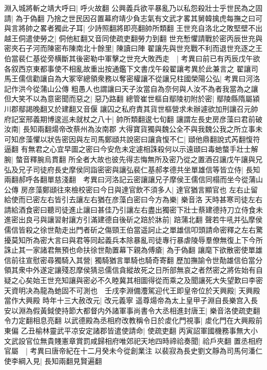 淵入城將斬之靖大呼曰|{
	呼火故翻}
公興義兵欲平暴亂乃以私怨殺壯士乎世民為之固請|{
	為于偽翻}
乃捨之世民因召置幕府靖少負志氣有文武才畧其舅韓擒虎每撫之曰可與言將帥之畧者獨此子耳|{
	少詩照翻將即亮翻帥所類翻}
王世充自洛北之敗堅壁不出越王侗遣使勞之|{
	侗他紅翻又音同使疏吏翻勞力到翻}
世充慙懼請戰於密丙辰世充與密夾石子河而陳密布陳南北十餘里|{
	陳讀曰陣}
翟讓先與世充戰不利而退世充逐之王伯當裴仁基從旁横斷其後密勒中軍擊之世充大敗西走　|{
	考異曰前已有丙辰戊午欲各叙西京東都事使不相亂故重出按通鑑下文書戊午殺翟讓考異於此兼言之}
翟讓司馬王儒信勸讓自為大冢宰總領衆務以奪密權讓不從讓兄柱國榮陽公弘|{
	考異曰河洛記作洪今從蒲山公傳}
粗愚人也謂讓曰天子汝當自為奈何與人汝不為者我當為之讓但大笑不以為意密聞而惡之|{
	惡乃路翻}
總管崔世樞自鄢陵初附於密|{
	鄢陵縣隋屬潁川郡鄢謁晚翻又於建翻又音偃}
讓囚之私府責其貨世樞營求未辦遽欲加刑讓召元帥府記室邢義期博逡巡未就杖之八十|{
	帥所類翻逡七旬翻}
讓謂左長史房彦藻曰君前破汝南|{
	長知兩翻煬帝改蔡州為汝南郡}
大得寶貨獨與魏公全不與我魏公我之所立事未可知彦藻懼以狀告密因與左司馬鄭頲共說密曰讓貪愎不仁|{
	頲他鼎翻說式芮翻愎符逼翻}
有無君之心宜早圖之密曰今安危未定遽相誅殺何以示遠頲曰毒虵螫手壯士解腕|{
	螫音釋腕烏貫翻}
所全者大故也彼先得志悔無所及密乃從之置酒召讓戊午讓與兄弘及兄子司徒府長史摩侯同詣密密與讓弘裴仁基郝孝德共坐單雄信等皆立侍|{
	長知兩翻郝呼各翻單慈淺翻　考異曰河洛記云密讓讓兄子摩侯王儒信同榻而坐今從蒲山公傳}
房彦藻鄭頲往來檢校密曰今日與達官飲不須多人|{
	達官猶言顯官也}
左右止留給使而已密左右皆引去讓左右猶在彦藻白密曰今方為樂|{
	樂音洛}
天時甚寒司徒左右請給酒食密曰聽司徒進止讓曰甚佳乃引讓左右盡出獨密下壯士蔡建德持刀立侍食未進密出良弓與讓習射讓方引滿建德自後斫之踣於牀前|{
	踣蒲北翻}
聲若牛吼并弘摩侯儒信皆殺之徐世勣走出門者斫之傷頸王伯當遥訶止之單雄信叩頭請命密釋之左右驚擾莫知所為密大言曰與君等同起義兵本除暴亂司徒專行暴虐陵辱羣僚無復上下今所誅止其一家諸君無預也命扶徐世勣置幕下親為傅瘡|{
	為于偽翻}
讓麾下欲散密使單雄信前往宣慰密尋獨騎入其營|{
	獨騎猶言單騎也騎奇寄翻}
歷加撫諭令世勣雄信伯當分領其衆中外遂定讓殘忍摩侯猜忌儒信貪縱故死之日所部無哀之者然密之將佐始有自疑之心矣始王世充知讓與密必不久睦冀其相圖得從而乘之及聞讓死大失望歎曰李密天資明决為龍為虵固不可測也　壬戌李淵備灋駕迎代王即皇帝位於天興殿|{
	天興殿當作大興殿}
時年十三大赦改元|{
	改元義寧}
遥尊煬帝為太上皇甲子淵自長樂宫入長安以淵為假黃鉞使持節大都督内外諸軍事尚書令大丞相進封唐王|{
	樂音洛使疏吏翻令力定翻相息亮翻}
以武德殿為丞相府改教稱令日於䖍化門視事|{
	䖍化門在大興殿前東偏}
乙丑榆林靈武平凉安定諸郡皆遣使請命|{
	使疏吏翻}
丙寅詔軍國機務事無大小文武設官位無貴賤憲章賞罰咸歸相府唯郊祀天地四時禘祫奏聞|{
	祫戶夾翻}
置丞相府官屬　|{
	考異曰唐帝紀在十二月癸未今從創業注}
以裴寂為長史劉文靜為司馬何潘仁使李綱入見|{
	長知兩翻見賢遍翻}
